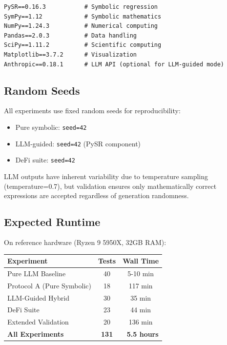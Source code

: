 \documentclass[twoside,11pt]{article}
\begin{document}
\begin{small}
\begin{verbatim}
PySR==0.16.3           # Symbolic regression
SymPy==1.12            # Symbolic mathematics
NumPy==1.24.3          # Numerical computing
Pandas==2.0.3          # Data handling
SciPy==1.11.2          # Scientific computing
Matplotlib==3.7.2      # Visualization
Anthropic==0.18.1      # LLM API (optional for LLM-guided mode)
\end{verbatim}
\end{small}

\subsection{Random Seeds}

All experiments use fixed random seeds for reproducibility:

\begin{itemize}
\item Pure symbolic: \texttt{seed=42}
\item LLM-guided: \texttt{seed=42} (PySR component)
\item DeFi suite: \texttt{seed=42}
\end{itemize}

LLM outputs have inherent variability due to temperature sampling (temperature=0.7), but validation ensures only mathematically correct expressions are accepted regardless of generation randomness.

\subsection{Expected Runtime}

On reference hardware (Ryzen 9 5950X, 32GB RAM):

\begin{table}[H]
\centering
\begin{tabular}{@{}lcc@{}}
\toprule
\textbf{Experiment} & \textbf{Tests} & \textbf{Wall Time} \\
\midrule
Pure LLM Baseline & 40 & 5-10 min \\
Protocol A (Pure Symbolic) & 18 & 117 min \\
LLM-Guided Hybrid & 30 & 35 min \\
DeFi Suite & 23 & 44 min \\
Extended Validation & 20 & 136 min \\
\midrule
\textbf{All Experiments} & \textbf{131} & \textbf{~5.5 hours} \\
\bottomrule
\end{tabular}
\end{table}
\end{document}
